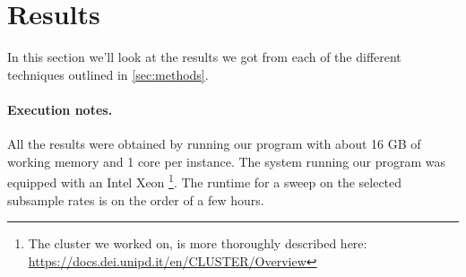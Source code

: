 \section{Results}
\label{sec:results}
In this section we'll look at the results we got from each of the different techniques outlined in \autoref{sec:methods}.

\paragraph{Execution notes.}
All the results were obtained by running our program with about 16 GB of working memory and 1 core per instance. The system running our program was equipped with an Intel Xeon \footnote{The cluster we worked on, is more thoroughly described here: \url{https://docs.dei.unipd.it/en/CLUSTER/Overview}}. The runtime for a sweep on the selected subsample rates is on the order of a few hours.

